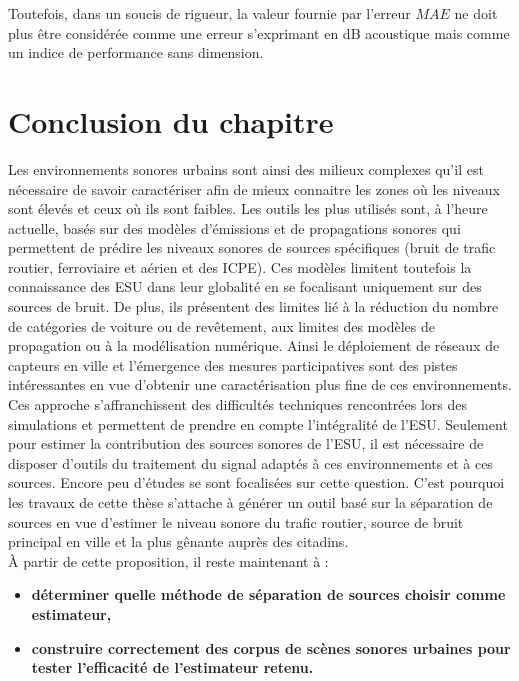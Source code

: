 Toutefois, dans un soucis de rigueur, la valeur fournie par l'erreur $MAE$ ne doit plus être considérée comme une erreur s'exprimant en dB acoustique mais comme un indice de performance sans dimension.\\

\section{Conclusion du chapitre}
Les environnements sonores urbains sont ainsi des milieux complexes qu'il est nécessaire de savoir caractériser afin de mieux connaitre les zones où les niveaux sont élevés et ceux où ils sont faibles. 
Les outils les plus utilisés sont, à l'heure actuelle, basés sur des modèles d'émissions et de propagations sonores qui permettent de prédire les niveaux sonores de sources spécifiques (bruit de trafic routier, ferroviaire et aérien et des ICPE). Ces modèles limitent toutefois la connaissance des ESU dans leur globalité en se focalisant uniquement sur des sources de bruit. De plus, ils présentent des limites lié à la réduction du nombre de catégories de voiture ou de revêtement, aux limites des modèles de propagation ou à la modélisation numérique.  
Ainsi le déploiement de réseaux de capteurs en ville et l'émergence des mesures participatives sont des pistes intéressantes en vue d'obtenir une caractérisation plus fine de ces environnements. Ces approche s'affranchissent des difficultés techniques rencontrées lors des simulations et permettent de prendre en compte l'intégralité de l'ESU.  Seulement pour estimer la contribution des sources sonores de l'ESU, il est nécessaire de disposer d'outils du traitement du signal adaptés à ces environnements et à ces sources. 
Encore peu d'études se sont focalisées sur cette question. C'est pourquoi les travaux de cette thèse s'attache à générer un outil basé sur la séparation de sources en vue d'estimer le niveau sonore du trafic routier, source de bruit principal en ville et la plus gênante auprès des citadins.\\

À partir de cette proposition, il reste maintenant à :
\begin{itemize}
\item \textbf{déterminer quelle méthode de séparation de sources choisir comme estimateur, }
\item \textbf{construire correctement des corpus de scènes sonores urbaines pour tester l'efficacité de l'estimateur retenu.}
\end{itemize}


